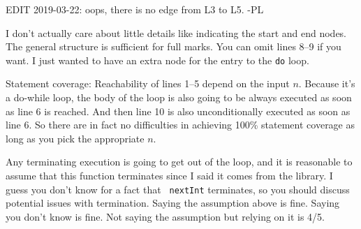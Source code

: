 \documentclass[11pt,onecolumn,letterpaper]{article}
\begin{document}
\begin{center}
\end{center}

EDIT 2019-03-22: oops, there is no edge from L3 to L5. -PL

I don't actually care about little details like indicating the start
and end nodes. The general structure is sufficient for full marks. You can
omit lines 8--9 if you want. I just wanted to have an extra node for the entry
to the {\tt do} loop.

Statement coverage: Reachability of lines 1--5 depend on the input $n$.
Because it's a do-while loop, the body of the loop is also going to be
always executed as soon as line 6 is reached. And then line 10 is also
unconditionally executed as soon as line 6. So there are in fact
no difficulties in achieving 100\% statement coverage as long
as you pick the appropriate $n$.

Any terminating execution is going to get out of the loop, and it is
reasonable to assume that this function terminates since I said it
comes from the library. I guess you don't know for a fact that {\tt
  nextInt} terminates, so you should discuss potential issues with
termination.  Saying the assumption above is fine. Saying you don't
know is fine. Not saying the assumption but relying on it is 4/5.
\end{document}
